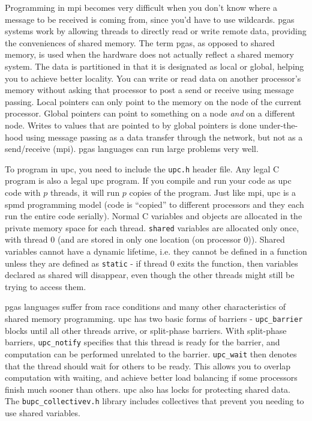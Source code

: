 \documentclass[10pt]{article}
\begin{document}
\begin{flushleft}
Programming in \gls{mpi} becomes very difficult when you don't know where a message to be received is coming from, since you'd have to use wildcards. \gls{pgas} systems work by allowing threads to directly read or write remote data, providing the conveniences of shared memory. The term \gls{pgas}, as opposed to shared memory, is used when the hardware does not actually reflect a shared memory system. The data is partitioned in that it is designated as local or global, helping you to achieve better locality. You can write or read data on another processor's memory without asking that processor to post a send or receive using message passing. Local pointers can only point to the memory on the node of the current processor. Global pointers can point to something on a node \textit{and} on a different node. Writes to values that are pointed to by global pointers is done under-the-hood using message passing as a data transfer through the network, but not as a send/receive (\gls{mpi}). \gls{pgas} languages can run large problems very well.

To program in \gls{upc}, you need to include the {\tt upc.h} header file. Any legal C program is also a legal \gls{upc} program. If you compile and run your code as \gls{upc} code with \(p\) threads, it will run \(p\) copies of the program. Just like \gls{mpi}, \gls{upc} is a \gls{spmd} programming model (code is ``copied'' to different processors and they each run the entire code serially). Normal C variables and objects are allocated in the private memory space for each thread. {\tt shared} variables are allocated only once, with thread 0 (and are stored in only one location (on processor 0)). Shared variables cannot have a dynamic lifetime, i.e. they cannot be defined in a function unless they are defined as {\tt static} - if thread 0 exits the function, then variables declared as shared will disappear, even though the other threads might still be trying to access them. 

\gls{pgas} languages suffer from race conditions and many other characteristics of shared memory programming. \gls{upc} has two basic forms of barriers - {\tt upc\_barrier} blocks until all other threads arrive, or split-phase barriers. With split-phase barriers, {\tt upc\_notify} specifies that this thread is ready for the barrier, and computation can be performed unrelated to the barrier. {\tt upc\_wait} then denotes that the thread should wait for others to be ready. This allows you to overlap computation with waiting, and achieve better load balancing if some processors finish much sooner than others. \gls{upc} also has locks for protecting shared data. The {\tt bupc\_collectivev.h} library includes collectives that prevent you needing to use shared variables.


\end{flushleft}
\end{document}
